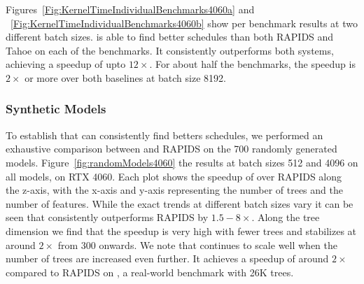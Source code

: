 

Figures~\ref{Fig:KernelTimeIndividualBenchmarks4060a} and ~\ref{Fig:KernelTimeIndividualBenchmarks4060b} 
show per benchmark results at two different batch sizes. 
\Treebeard{} is able to find better schedules than both RAPIDS and Tahoe on each of the benchmarks. It consistently
outperforms both systems, achieving a speedup of upto $12\times$.
For about half the benchmarks, the speedup is $2\times$ or more over both baselines at batch size 8192.
\subsubsection*{Synthetic Models}
To establish that \Treebeard{} can consistently find betters schedules, we performed an exhaustive comparison between \Treebeard{} and RAPIDS on the 700 randomly generated models.   
Figure~\ref{fig:randomModels4060} the results at batch sizes 512 and 4096 on all models, on RTX 4060. 
Each plot shows the speedup of \Treebeard{} over RAPIDS along the z-axis, with the x-axis and y-axis representing the number of trees and the number of features. 
While the exact trends at different batch sizes vary it can be seen that \Treebeard{} consistently outperforms RAPIDS by $1.5-8\times$. Along the tree 
dimension we find that the speedup is very high with fewer trees and stabilizes at around $2\times$ from 300 onwards. We note that \Treebeard{} continues to scale well 
when the number of trees are increased even further. It achieves a speedup of around $2\times$ compared to RAPIDS on , a real-world benchmark
with 26K trees.

